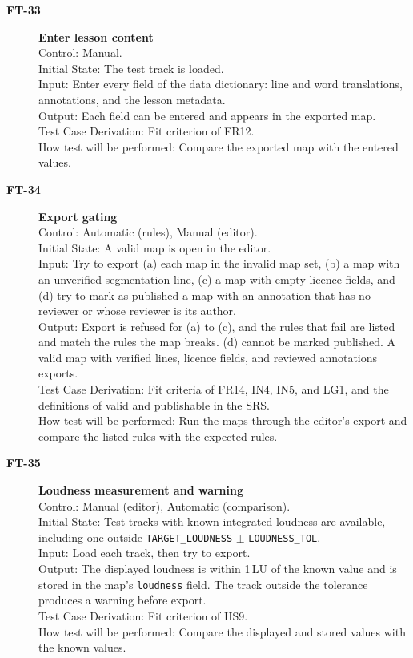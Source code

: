 \documentclass[12pt, titlepage]{article}
\newcommand{\tid}[1]{\hypertarget{test:#1}{\textbf{#1}}}
\newcommand{\cn}[1]{\texttt{#1}}
\begin{document}
\begin{description}
\item[\tid{FT-33}] \textbf{Enter lesson content}\\
Control: Manual.\\
Initial State: The test track is loaded.\\
Input: Enter every field of the data dictionary: line and word translations,
annotations, and the lesson metadata.\\
Output: Each field can be entered and appears in the exported map.\\
Test Case Derivation: Fit criterion of FR12.\\
How test will be performed: Compare the exported map with the entered values.

\item[\tid{FT-34}] \textbf{Export gating}\\
Control: Automatic (rules), Manual (editor).\\
Initial State: A valid map is open in the editor.\\
Input: Try to export (a) each map in the invalid map set, (b) a map with an
unverified segmentation line, (c) a map with empty licence fields, and (d) try
to mark as published a map with an annotation that has no reviewer or whose
reviewer is its author.\\
Output: Export is refused for (a) to (c), and the rules that fail are listed and
match the rules the map breaks. (d) cannot be marked published. A valid map with
verified lines, licence fields, and reviewed annotations exports.\\
Test Case Derivation: Fit criteria of FR14, IN4, IN5, and LG1, and the
definitions of valid and publishable in the SRS.\\
How test will be performed: Run the maps through the editor's export and compare
the listed rules with the expected rules.

\item[\tid{FT-35}] \textbf{Loudness measurement and warning}\\
Control: Manual (editor), Automatic (comparison).\\
Initial State: Test tracks with known integrated loudness are available,
including one outside \cn{TARGET\_LOUDNESS} $\pm$ \cn{LOUDNESS\_TOL}.\\
Input: Load each track, then try to export.\\
Output: The displayed loudness is within 1\,LU of the known value and is stored
in the map's \texttt{loudness} field. The track outside the tolerance produces a
warning before export.\\
Test Case Derivation: Fit criterion of HS9.\\
How test will be performed: Compare the displayed and stored values with the
known values.


\end{description}
\end{document}
